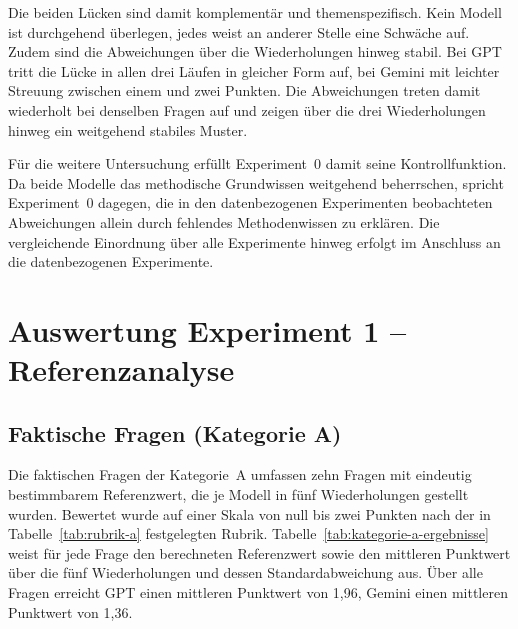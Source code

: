 Die beiden Lücken sind damit komplementär und themenspezifisch. Kein Modell ist durchgehend überlegen, jedes weist an anderer Stelle eine Schwäche auf. Zudem sind die Abweichungen über die Wiederholungen hinweg stabil. Bei GPT tritt die Lücke in allen drei Läufen in gleicher Form auf, bei Gemini mit leichter Streuung zwischen einem und zwei Punkten. Die Abweichungen treten damit wiederholt bei denselben Fragen auf und zeigen über die drei Wiederholungen hinweg ein weitgehend stabiles Muster.

Für die weitere Untersuchung erfüllt Experiment~0 damit seine Kontrollfunktion. Da beide Modelle das methodische Grundwissen weitgehend beherrschen, spricht Experiment~0 dagegen, die in den datenbezogenen Experimenten beobachteten Abweichungen allein durch fehlendes Methodenwissen zu erklären. Die vergleichende Einordnung über alle Experimente hinweg erfolgt im Anschluss an die datenbezogenen Experimente.

\section{Auswertung Experiment 1 -- Referenzanalyse}

\subsection{Faktische Fragen (Kategorie A)}
\label{subsec:ergebnisse-a}

Die faktischen Fragen der Kategorie~A umfassen zehn Fragen mit eindeutig bestimmbarem Referenzwert, die je Modell in fünf Wiederholungen gestellt wurden. Bewertet wurde auf einer Skala von null bis zwei Punkten nach der in Tabelle~\ref{tab:rubrik-a} festgelegten Rubrik. Tabelle~\ref{tab:kategorie-a-ergebnisse} weist für jede Frage den berechneten Referenzwert sowie den mittleren Punktwert über die fünf Wiederholungen und dessen Standardabweichung aus. Über alle Fragen erreicht GPT einen mittleren Punktwert von 1,96, Gemini einen mittleren Punktwert von 1,36. 

